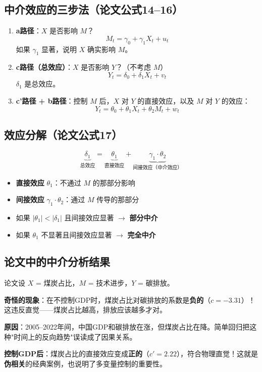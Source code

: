 \documentclass[12pt, a4paper]{article}
\begin{document}
\subsection{中介效应的三步法（论文公式14--16）}

\begin{enumerate}[leftmargin=2em]
\item \textbf{a路径}：$X$ 是否影响 $M$？
\[
M_t = \gamma_0 + \gamma_1 X_t + u_t
\]
如果 $\gamma_1$ 显著，说明 $X$ 确实影响 $M$。

\item \textbf{c路径（总效应）}：$X$ 是否影响 $Y$？（不考虑 $M$）
\[
Y_t = \delta_0 + \delta_1 X_t + v_t
\]
 $\delta_1$ 是总效应。

\item \textbf{c'路径 + b路径}：控制 $M$ 后，$X$ 对 $Y$ 的直接效应，以及 $M$ 对 $Y$ 的效应：
\[
Y_t = \theta_0 + \theta_1 X_t + \theta_2 M_t + w_t
\]
\end{enumerate}

\subsection{效应分解（论文公式17）}

\[
\underbrace{\delta_1}_{\text{总效应}} = \underbrace{\theta_1}_{\text{直接效应}} + \underbrace{\gamma_1 \cdot \theta_2}_{\text{间接效应（中介效应）}}
\]

\begin{itemize}[leftmargin=2em]
\item \textbf{直接效应} $\theta_1$：不通过 $M$ 的那部分影响
\item \textbf{间接效应} $\gamma_1 \cdot \theta_2$：通过 $M$ 传导的那部分
\item 如果 $|\theta_1| < |\delta_1|$ 且间接效应显著 $\to$ \textbf{部分中介}
\item 如果 $\theta_1$ 不显著且间接效应显著 $\to$ \textbf{完全中介}
\end{itemize}

\subsection{论文中的中介分析结果}

\begin{purplebox}
论文设 $X$ = 煤炭占比，$M$ = 技术进步，$Y$ = 碳排放。

\textbf{奇怪的现象}：在不控制GDP时，煤炭占比对碳排放的系数是\textbf{负的}（$c = -3.31$）！这违反直觉——煤炭占比越高，排放应该越多才对。

\textbf{原因}：2005--2022年间，中国GDP和碳排放在涨，但煤炭占比在降。简单回归把这种"时间上的反向趋势"误读成了因果关系。

\textbf{控制GDP后}：煤炭占比的直接效应变成\textbf{正的}（$c' = 2.22$），符合物理直觉！这就是\textbf{伪相关}的经典案例，也说明了多变量控制的重要性。
\end{purplebox}
\end{document}
